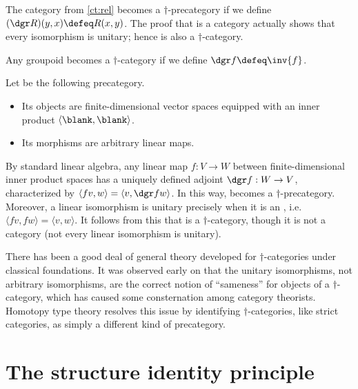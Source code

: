 \begin{eg}\label{ct:rel-dagger-cat}
  The category \urel from \cref{ct:rel} becomes a $\dagger$-pre\-cat\-e\-go\-ry if we define $(\dgr R)(y,x) \defeq R(x,y)$.
  The proof that \urel is a category actually shows that every isomorphism is unitary; hence \urel is also a $\dagger$-category.
\end{eg}

\begin{eg}\label{ct:groupoid-dagger-cat}
  Any groupoid becomes a $\dagger$-category if we define $\dgr f \defeq \inv{f}$.
\end{eg}

\begin{eg}\label{ct:hilb}
  Let \uhilb be the following precategory.
  \begin{itemize}
  \item Its objects are finite-dimensional  vector spaces equipped with an inner product $\langle \blank,\blank\rangle$.
  \item Its morphisms are arbitrary linear maps.
  \end{itemize}
  By standard linear algebra, any linear map $f:V\to W$ between finite-dimensional inner product spaces has a uniquely defined adjoint $\dgr f:W\to V$, characterized by $\langle f v,w\rangle = \langle v,\dgr f w\rangle$.
  In this way, \uhilb becomes a $\dagger$-precategory.
  Moreover, a linear isomorphism is unitary precisely when it is an ,
  i.e.\ $\langle fv,fw\rangle = \langle v,w\rangle$.
  It follows from this that \uhilb is a $\dagger$-category, though it is not a category (not every linear isomorphism is unitary).
\end{eg}

There has been a good deal of general theory developed for $\dagger$-cat\-e\-gor\-ies under classical foundations.
It was observed early on that the unitary isomorphisms, not arbitrary isomorphisms, are the correct notion of ``sameness'' for objects of a $\dagger$-category, which has caused some consternation among category theorists.
Homotopy type theory resolves this issue by identifying $\dagger$-categories, like strict categories, as simply a different kind of precategory.


\section{The structure identity principle}
\label{sec:sip}

